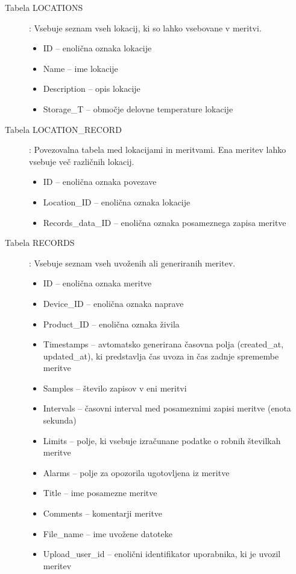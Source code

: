 \documentclass[a4paper, 12pt]{book}
\begin{document}
\begin{description}
\item[Tabela LOCATIONS] : Vsebuje seznam vseh lokacij, ki so lahko vsebovane v meritvi.
	\begin{itemize}
		\item ID – enolična oznaka lokacije
		\item Name – ime lokacije
		\item Description – opis lokacije
		\item Storage\_T – območje delovne temperature lokacije
	\end{itemize}
	
\item[Tabela LOCATION\_RECORD] : Povezovalna tabela med lokacijami in meritvami. Ena meritev lahko vsebuje več različnih lokacij.
	\begin{itemize}
		\item ID – enolična oznaka povezave
		\item Location\_ID – enolična oznaka lokacije
		\item Records\_data\_ID – enolična oznaka posameznega zapisa meritve
	\end{itemize}
	
\item[Tabela RECORDS] : Vsebuje seznam vseh uvoženih ali generiranih meritev.
	\begin{itemize}
		\item ID – enolična oznaka meritve
		\item Device\_ID – enolična oznaka naprave
		\item Product\_ID – enolična oznaka živila
		\item Timestamps – avtomatsko generirana časovna polja (created\_at, updated\_at), ki predstavlja čas uvoza in čas zadnje spremembe meritve
		\item Samples – število zapisov v eni meritvi
		\item Intervals – časovni interval med posameznimi zapisi meritve (enota sekunda)
		\item Limits – polje, ki vsebuje izračunane podatke o robnih številkah meritve
		\item Alarms – polje za opozorila ugotovljena iz meritve
		\item Title – ime posamezne meritve
		\item Comments – komentarji meritve
		\item File\_name – ime uvožene datoteke
		\item Upload\_user\_id – enolični identifikator uporabnika, ki je uvozil meritev
	\end{itemize}
	

\end{description}
\end{document}
